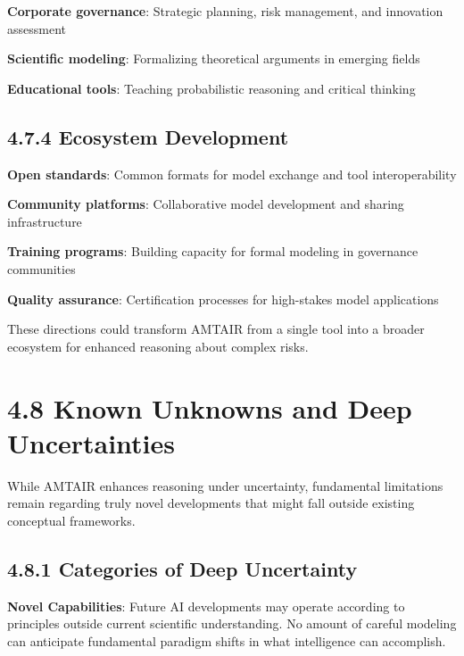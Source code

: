 \documentclass[
  11pt,
  letterpaper,
]{book}
\begin{document}
\textbf{Corporate governance}: Strategic planning, risk management, and
innovation assessment

\textbf{Scientific modeling}: Formalizing theoretical arguments in
emerging fields

\textbf{Educational tools}: Teaching probabilistic reasoning and
critical thinking

\subsection*{4.7.4 Ecosystem Development}\label{sec-ecosystem-future}

\textbf{Open standards}: Common formats for model exchange and tool
interoperability

\textbf{Community platforms}: Collaborative model development and
sharing infrastructure

\textbf{Training programs}: Building capacity for formal modeling in
governance communities

\textbf{Quality assurance}: Certification processes for high-stakes
model applications

These directions could transform AMTAIR from a single tool into a
broader ecosystem for enhanced reasoning about complex risks.

\section*{4.8 Known Unknowns and Deep
Uncertainties}\label{sec-deep-uncertainties}


While AMTAIR enhances reasoning under uncertainty, fundamental
limitations remain regarding truly novel developments that might fall
outside existing conceptual frameworks.

\subsection*{4.8.1 Categories of Deep
Uncertainty}\label{sec-uncertainty-categories}

\textbf{Novel Capabilities}: Future AI developments may operate
according to principles outside current scientific understanding. No
amount of careful modeling can anticipate fundamental paradigm shifts in
what intelligence can accomplish.
\end{document}

